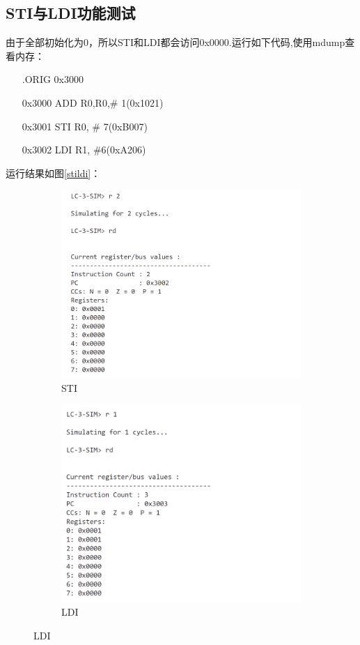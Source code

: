 \documentclass[UTF8]{ctexart}
\begin{document}
\subsection{STI与LDI功能测试}
由于全部初始化为0，所以STI和LDI都会访问0x0000.运行如下代码,使用mdump查看内存：
\begin{enumerate}
  \item [ ] .ORIG 0x3000
  \item [0x3000] ADD R0,R0,\# 1(0x1021)
  \item [0x3001] STI R0, \# 7(0xB007)
  \item [0x3002] LDI R1, \#6(0xA206)
\end{enumerate}
运行结果如图\ref{stildi}：
\begin{figure}[ht]
  \centering
  \begin{subfigure}{0.45\textwidth}
    \includegraphics[width=\linewidth]{sti1.png}
    \caption{STI}
  \end{subfigure}
  \begin{subfigure}{0.45\textwidth}
    \includegraphics[width=\linewidth]{sti2.png}
    \caption{LDI}
  \end{subfigure}


\end{figure}
\end{document}
